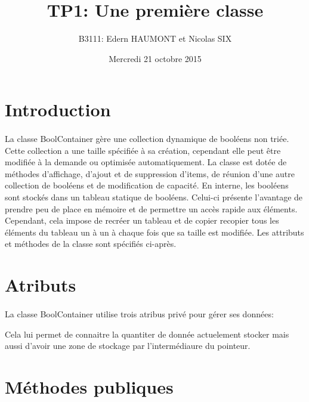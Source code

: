 \documentclass[a4paper, 12pts]{article}
\title{TP1: Une première classe}
\author{B3111: Edern HAUMONT et Nicolas SIX}
\date{Mercredi 21 octobre 2015}
\begin{document}

\maketitle






\section{Introduction}
\paragraph{}
La classe BoolContainer gère une collection dynamique de booléens non triée. Cette collection a une taille spécifiée à sa création, cependant elle peut être modifiée à la demande ou optimisée automatiquement.
La classe est dotée de méthodes d’affichage, d’ajout et de suppression d’items, de réunion d’une autre collection de booléens et de modification de capacité.
En interne, les booléens sont stockés dans un tableau statique de booléens. Celui-ci présente l'avantage de prendre peu de place en mémoire et de permettre un accès rapide aux éléments. Cependant, cela impose de recréer un tableau et de copier recopier tous les éléments du tableau un à un à chaque fois que sa taille est modifiée.
Les attributs et méthodes de la classe sont spécifiés ci-après.

\section{Atributs}
\paragraph{}
La classe BoolContainer utilise trois atribus privé pour gérer ses données:

Cela lui permet de connaitre la quantiter de donnée actuelement stocker mais aussi d'avoir une zone de stockage par l'intermédiaure du pointeur.

\section{Méthodes publiques}
\end{document}
